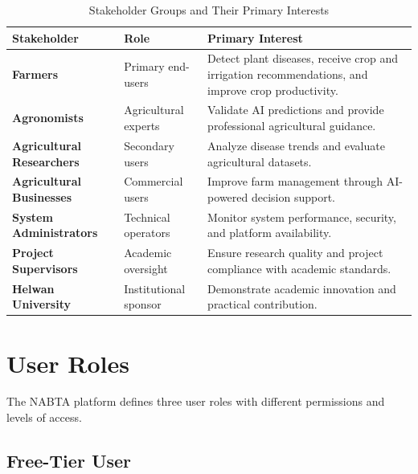 \begin{table}[H]
\centering
\caption{Stakeholder Groups and Their Primary Interests}
\label{tab:stakeholders}
\renewcommand{\arraystretch}{1.4}
\begin{tabularx}{\textwidth}{>{\bfseries}l X X}
\toprule
Stakeholder & Role & Primary Interest \\
\midrule
Farmers & Primary end-users & Detect plant diseases, receive crop and irrigation recommendations, and improve crop productivity.\\

Agronomists & Agricultural experts & Validate AI predictions and provide professional agricultural guidance.\\

Agricultural Researchers & Secondary users & Analyze disease trends and evaluate agricultural datasets.\\

Agricultural Businesses & Commercial users & Improve farm management through AI-powered decision support.\\

System Administrators & Technical operators & Monitor system performance, security, and platform availability.\\

Project Supervisors & Academic oversight & Ensure research quality and project compliance with academic standards.\\

Helwan University & Institutional sponsor & Demonstrate academic innovation and practical contribution.\\
\bottomrule
\end{tabularx}
\end{table}

\section{User Roles}
\label{sec:analysis_roles}

The NABTA platform defines three user roles with different permissions and levels of access.

\subsection{Free-Tier User}
\label{subsec:free_user}

